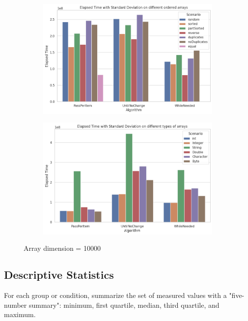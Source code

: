\documentclass{article}
\begin{document}
\begin{figure}[H]
    \centering
    \begin{subfigure}[b]{0.4\textwidth}
        \centering
        \includegraphics[width=\textwidth]{./data/std_order_array_10000.png}
    \end{subfigure}
    \hfill
    \begin{subfigure}[b]{0.4\textwidth}
        \centering
        \includegraphics[width=\textwidth]{./data/std_type_array_10000.png}
    \end{subfigure}
    \caption{Array dimension = 10000}
\end{figure}

\subsection{Descriptive Statistics}
For each group or condition, summarize the set of measured values with a "five-number summary": minimum, first quartile, median, third quartile, and maximum. 
\end{document}
